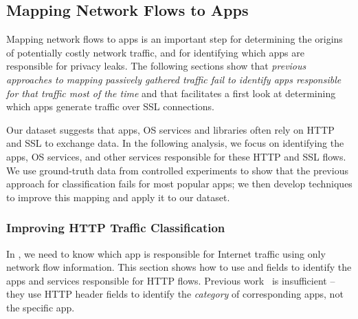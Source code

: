 \subsection{Mapping Network Flows to Apps}
\label{sec:classification-methodology}

Mapping network flows to apps is an important step for determining the origins of potentially costly 
network traffic, and for identifying which apps are responsible for privacy leaks. The following 
sections show that  \emph{previous approaches to mapping passively gathered traffic fail to identify
apps responsible for that traffic most of the time} and that \meddle facilitates a first look at 
determining which apps generate traffic over SSL connections.





Our \mobWild dataset suggests that apps, OS services and libraries often rely on HTTP and SSL to exchange data.
In the following analysis, we focus on identifying the apps, OS services, and other services responsible for these HTTP and SSL flows. 
We use ground-truth data from controlled experiments to show that the previous approach for classification fails 
for most popular apps; we then develop techniques to improve this mapping and apply it to our \mobWild dataset. 

\subsubsection{Improving HTTP Traffic Classification}
In \meddle, we need to know which app is responsible for Internet traffic using only network flow information. This section shows how to use \useragent and \httphost fields to identify the apps and services responsible for HTTP flows. Previous work~\cite{maier:mobtraffic,xu:appusage,falaki:mobileusage,falaki:smartphoneusage} is insufficient -- they use HTTP header fields to identify the \emph{category} of corresponding apps, not the specific app.


